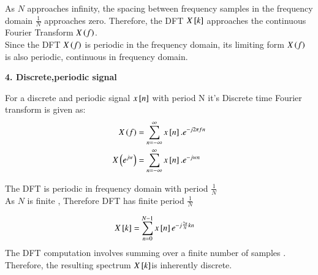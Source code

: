 \documentclass[journal,12pt,onecolumn]{IEEEtran}
\theoremstyle{remark}
\begin{document}
As  $N$ approaches infinity, the spacing between frequency samples in the frequency domain  $\frac{1}{N}$  approaches zero. Therefore, the DFT $X{}\left[k\right]$ approaches the continuous Fourier Transform $X\left(f\right)$. \\

Since the DFT $X\left(f\right)$  is periodic in the frequency domain, its limiting form $X\left(f\right)$ is also periodic, continuous in frequency domain.

\vspace{2mm}
\textbf{4. Discrete,periodic signal}

For a discrete and periodic signal  $x{}\left[n\right]$ with period N it's Discrete time Fourier transform is given as: 
\begin{align}
X\left(f\right)&= \sum_{n=-\infty}^{\infty} x{}\left[n\right].e^{-j2\pi fn}\\
X\left(e^{jw}\right)&= \sum_{n=-\infty}^{\infty} x{}\left[n\right].e^{-jwn}
\end{align}

The DFT is periodic in frequency domain with period $\frac{1}{N}$\\

As $N$ is finite , Therefore DFT has finite period $\frac{1}{N}$

\begin{align}
X{}\left[k\right]&=\sum_{n=0}^{N-1}x{}\left[n\right]e^{-j\frac{2\pi}{N}kn}
\end{align}
The DFT computation involves summing over a finite number of samples . Therefore, the resulting spectrum  $X{}\left[k\right]$is inherently discrete.
\end{document}
